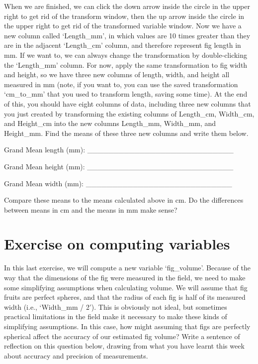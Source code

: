 \documentclass[
  openany]{scrbook}
\begin{document}
When we are finished, we can click the down arrow inside the circle in the upper right to get rid of the transform window, then the up arrow inside the circle in the upper right to get rid of the transformed variable window.
Now we have a new column called `Length\_mm', in which values are 10 times greater than they are in the adjacent `Length\_cm' column, and therefore represent fig length in mm.
If we want to, we can always change the transformation by double-clicking the `Length\_mm' column.
For now, apply the same transformation to fig width and height, so we have three new columns of length, width, and height all measured in mm (note, if you want to, you can use the saved transformation `cm\_to\_mm' that you used to transform length, saving some time).
At the end of this, you should have eight columns of data, including three new columns that you just created by transforming the existing columns of Length\_cm, Width\_cm, and Height\_cm into the new columns Length\_mm, Width\_mm, and Height\_mm.
Find the means of these three new columns and write them below.

Grand Mean length (mm): \_\_\_\_\_\_\_\_\_\_\_\_\_\_\_\_\_\_\_\_\_\_\_\_\_\_\_\_

Grand Mean height (mm): \_\_\_\_\_\_\_\_\_\_\_\_\_\_\_\_\_\_\_\_\_\_\_\_\_\_\_\_

Grand Mean width (mm): \_\_\_\_\_\_\_\_\_\_\_\_\_\_\_\_\_\_\_\_\_\_\_\_\_\_\_\_

Compare these means to the means calculated above in cm.
Do the differences between means in cm and the means in mm make sense?

\hypertarget{computing_variables_02}{%
\section{Exercise on computing variables}\label{computing_variables_02}}

In this last exercise, we will compute a new variable `fig\_volume'.
Because of the way that the dimensions of the fig were measured in the field, we need to make some simplifying assumptions when calculating volume.
We will assume that fig fruits are perfect spheres, and that the radius of each fig is half of its measured width (i.e., `Width\_mm / 2').
This is obviously not ideal, but sometimes practical limitations in the field make it necessary to make these kinds of simplifying assumptions.
In this case, how might assuming that figs are perfectly spherical affect the accuracy of our estimated fig volume?
Write a sentence of reflection on this question below, drawing from what you have learnt this week about accuracy and precision of measurements.
\end{document}

